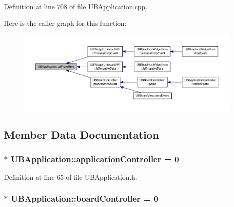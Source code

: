 Definition at line 708 of file U\-B\-Application.\-cpp.



Here is the caller graph for this function\-:
\nopagebreak
\begin{figure}[H]
\begin{center}
\leavevmode
\includegraphics[width=350pt]{d8/d81/class_u_b_application_acb4388f1e2e5c3b1db136211011de165_icgraph}
\end{center}
\end{figure}




\subsection{Member Data Documentation}
\hypertarget{class_u_b_application_a9ef16693fe3a6bf576b1e86c8fead18e}{
\subsubsection[{application\-Controller}]{ $\ast$ U\-B\-Application\-::application\-Controller = 0\hspace{0.3cm}{\ttfamily [static]}}}\label{d8/d81/class_u_b_application_a9ef16693fe3a6bf576b1e86c8fead18e}


Definition at line 65 of file U\-B\-Application.\-h.

\hypertarget{class_u_b_application_a34aa9a6616b61208ada7ff5fb228e5ff}{
\subsubsection[{board\-Controller}]{ $\ast$ U\-B\-Application\-::board\-Controller = 0\hspace{0.3cm}{\ttfamily [static]}}}\label{d8/d81/class_u_b_application_a34aa9a6616b61208ada7ff5fb228e5ff}


